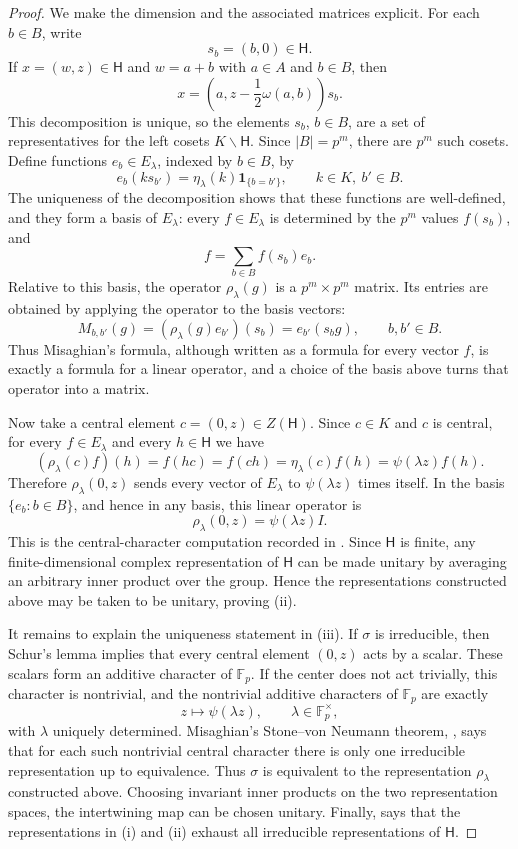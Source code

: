 \documentclass[11pt, reqno]{amsart}
\numberwithin{equation}{section}
\newcommand{\Fp}{\mathbb F_p}
\newcommand{\Heis}{\mathsf H}
\newcommand{\one}{\mathbf 1}
\begin{document}
\begin{proof}
We make the dimension and the associated matrices explicit.  For each $b\in B$,
write
\[
    s_b=(b,0)\in\Heis.
\]
If $x=(w,z)\in\Heis$ and $w=a+b$ with $a\in A$ and $b\in B$, then
\[
    x=\left(a,z-\frac12\omega(a,b)\right)s_b.
\]
This decomposition is unique, so the elements $s_b$, $b\in B$, are a set of
representatives for the left cosets $K\backslash \Heis$.  Since $|B|=p^m$, there
are $p^m$ such cosets.  Define functions $e_b\in E_\lambda$, indexed by
$b\in B$, by
\[
    e_b(k s_{b'})=\eta_\lambda(k)\one_{\{b=b'\}},\qquad
    k\in K,\ b'\in B.
\]
The uniqueness of the decomposition shows that these functions are well-defined,
and they form a basis of $E_\lambda$: every $f\in E_\lambda$ is determined by the
$p^m$ values $f(s_b)$, and
\[
    f=\sum_{b\in B} f(s_b)e_b.
\]
Relative to this basis, the operator $\rho_\lambda(g)$ is a $p^m\times p^m$
matrix.  Its entries are obtained by applying the operator to the basis vectors:
\[
    M_{b,b'}(g)=(\rho_\lambda(g)e_{b'})(s_b)=e_{b'}(s_b g),\qquad b,b'\in B.
\]
Thus Misaghian's formula, although written as a formula for every vector $f$,
is exactly a formula for a linear operator, and a choice of the basis above turns
that operator into a matrix.

Now take a central element $c=(0,z)\in Z(\Heis)$.  Since $c\in K$ and $c$ is
central, for every $f\in E_\lambda$ and every $h\in\Heis$ we have
\[
    (\rho_\lambda(c)f)(h)
    =f(hc)
    =f(ch)
    =\eta_\lambda(c)f(h)
    =\psi(\lambda z)f(h).
\]
Therefore $\rho_\lambda(0,z)$ sends every vector of $E_\lambda$ to
$\psi(\lambda z)$ times itself.  In the basis $\{e_b:b\in B\}$, and hence in any
basis, this linear operator is
\[
    \rho_\lambda(0,z)=\psi(\lambda z)I.
\]
This is the central-character computation recorded in
\cite[Corollary~8, p.~169]{Misaghian2010}.  Since $\Heis$ is finite, any
finite-dimensional complex representation of $\Heis$ can be made unitary by
averaging an arbitrary inner product over the group.  Hence the representations
constructed above may be taken to be unitary, proving \textup{(ii)}.

It remains to explain the uniqueness statement in \textup{(iii)}.  If $\sigma$ is
irreducible, then Schur's lemma implies that every central element $(0,z)$ acts
by a scalar.  These scalars form an additive character of $\Fp$.  If the center
does not act trivially, this character is nontrivial, and the nontrivial additive
characters of $\Fp$ are exactly
\[
    z\mapsto \psi(\lambda z),\qquad \lambda\in\Fp^\times,
\]
with $\lambda$ uniquely determined.  Misaghian's Stone--von Neumann theorem,
\cite[Theorem~1, p.~162]{Misaghian2010}, says that for each such nontrivial
central character there is only one irreducible representation up to equivalence.
Thus $\sigma$ is equivalent to the representation $\rho_\lambda$ constructed
above.  Choosing invariant inner products on the two representation spaces, the
intertwining map can be chosen unitary.  Finally,
\cite[Corollary~10, p.~170]{Misaghian2010} says that the representations in
\textup{(i)} and \textup{(ii)} exhaust all irreducible representations of $\Heis$.


\end{proof}
\end{document}
